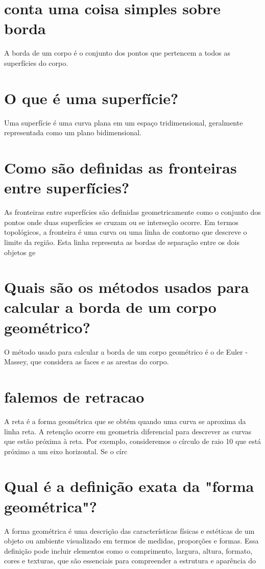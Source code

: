 \documentclass[11pt,a4paper]{article}
\begin{document}
\section{conta uma coisa simples sobre borda}
A borda de um corpo é o conjunto dos pontos que pertencem a todos as superfícies do corpo.

\section{O que é uma superfície?}
Uma superfície é uma curva plana em um espaço tridimensional, geralmente representada como um plano bidimensional.

\section{Como são definidas as fronteiras entre superfícies?}
As fronteiras entre superfícies são definidas geometricamente como o conjunto dos pontos onde duas superfícies se cruzam ou se interseção ocorre. Em termos topológicos, a fronteira é uma curva ou uma linha de contorno que descreve o limite da região. Esta linha representa as bordas de separação entre os dois objetos ge

\section{Quais são os métodos usados para calcular a borda de um corpo geométrico?}
O método usado para calcular a borda de um corpo geométrico é o de Euler - Massey, que considera as faces e as arestas do corpo.

\section{falemos de retracao}
A reta é a forma geométrica que se obtém quando uma curva se aproxima da linha reta. A retenção ocorre em geometria diferencial para descrever as curvas que estão próxima à reta. Por exemplo, consideremos o círculo de raio 10 que está próximo a um eixo horizontal. Se o círc

\section{Qual é a definição exata da "forma geométrica"?}
A forma geométrica é uma descrição das características físicas e estéticas de um objeto ou ambiente visualizado em termos de medidas, proporções e formas. Essa definição pode incluir elementos como o comprimento, largura, altura, formato, cores e texturas, que são essenciais para compreender a estrutura e aparência do 
\end{document}
